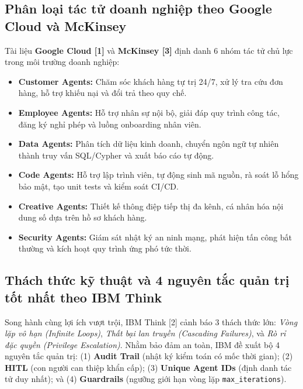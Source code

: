 \documentclass[12pt,a4paper]{article}
\begin{document}
\subsection{Phân loại tác tử doanh nghiệp theo Google Cloud và McKinsey}
Tài liệu \textbf{Google Cloud [1]} và \textbf{McKinsey [3]} định danh 6 nhóm tác tử chủ lực trong môi trường doanh nghiệp:
\begin{itemize}
    \item \textbf{Customer Agents:} Chăm sóc khách hàng tự trị 24/7, xử lý tra cứu đơn hàng, hỗ trợ khiếu nại và đổi trả theo quy chế.
    \item \textbf{Employee Agents:} Hỗ trợ nhân sự nội bộ, giải đáp quy trình công tác, đăng ký nghỉ phép và luồng onboarding nhân viên.
    \item \textbf{Data Agents:} Phân tích dữ liệu kinh doanh, chuyển ngôn ngữ tự nhiên thành truy vấn SQL/Cypher và xuất báo cáo tự động.
    \item \textbf{Code Agents:} Hỗ trợ lập trình viên, tự động sinh mã nguồn, rà soát lỗ hổng bảo mật, tạo unit tests và kiểm soát CI/CD.
    \item \textbf{Creative Agents:} Thiết kế thông điệp tiếp thị đa kênh, cá nhân hóa nội dung số dựa trên hồ sơ khách hàng.
    \item \textbf{Security Agents:} Giám sát nhật ký an ninh mạng, phát hiện tấn công bất thường và kích hoạt quy trình ứng phó tức thời.
\end{itemize}

\subsection{Thách thức kỹ thuật và 4 nguyên tắc quản trị tốt nhất theo IBM Think}
Song hành cùng lợi ích vượt trội, IBM Think [2] cảnh báo 3 thách thức lớn: \textit{Vòng lặp vô hạn (Infinite Loops)}, \textit{Thất bại lan truyền (Cascading Failures)}, và \textit{Rò rỉ đặc quyền (Privilege Escalation)}. Nhằm bảo đảm an toàn, IBM đề xuất bộ 4 nguyên tắc quản trị: (1) \textbf{Audit Trail} (nhật ký kiểm toán có mốc thời gian); (2) \textbf{HITL} (con người can thiệp khẩn cấp); (3) \textbf{Unique Agent IDs} (định danh tác tử duy nhất); và (4) \textbf{Guardrails} (ngưỡng giới hạn vòng lặp \texttt{max\_iterations}).
\end{document}
